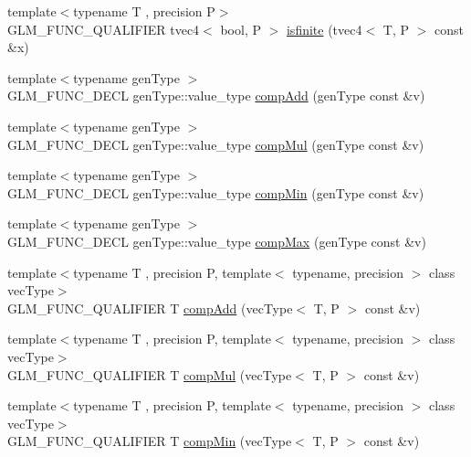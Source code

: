 \begin{DoxyCompactItemize}
\item 
{\footnotesize template$<$typename T , precision P$>$ }\\G\+L\+M\+\_\+\+F\+U\+N\+C\+\_\+\+Q\+U\+A\+L\+I\+F\+I\+E\+R tvec4$<$ bool, P $>$ \hyperlink{namespaceglm_a663d4b476d316e1da9db81a79e9de667}{isfinite} (tvec4$<$ T, P $>$ const \&x)
\item 
{\footnotesize template$<$typename gen\+Type $>$ }\\G\+L\+M\+\_\+\+F\+U\+N\+C\+\_\+\+D\+E\+C\+L gen\+Type\+::value\+\_\+type \hyperlink{group__gtx__component__wise_gaf71833350e15e74d31cbf8a3e7f27051}{comp\+Add} (gen\+Type const \&v)
\item 
{\footnotesize template$<$typename gen\+Type $>$ }\\G\+L\+M\+\_\+\+F\+U\+N\+C\+\_\+\+D\+E\+C\+L gen\+Type\+::value\+\_\+type \hyperlink{group__gtx__component__wise_gae8ab88024197202c9479d33bdc5a8a5d}{comp\+Mul} (gen\+Type const \&v)
\item 
{\footnotesize template$<$typename gen\+Type $>$ }\\G\+L\+M\+\_\+\+F\+U\+N\+C\+\_\+\+D\+E\+C\+L gen\+Type\+::value\+\_\+type \hyperlink{group__gtx__component__wise_gab5d0832b5c7bb01b8d7395973bfb1425}{comp\+Min} (gen\+Type const \&v)
\item 
{\footnotesize template$<$typename gen\+Type $>$ }\\G\+L\+M\+\_\+\+F\+U\+N\+C\+\_\+\+D\+E\+C\+L gen\+Type\+::value\+\_\+type \hyperlink{group__gtx__component__wise_gabfa4bb19298c8c73d4217ba759c496b6}{comp\+Max} (gen\+Type const \&v)
\item 
{\footnotesize template$<$typename T , precision P, template$<$ typename, precision $>$ class vec\+Type$>$ }\\G\+L\+M\+\_\+\+F\+U\+N\+C\+\_\+\+Q\+U\+A\+L\+I\+F\+I\+E\+R T \hyperlink{namespaceglm_a766b58e13ddfe3140ce22939887aa954}{comp\+Add} (vec\+Type$<$ T, P $>$ const \&v)
\item 
{\footnotesize template$<$typename T , precision P, template$<$ typename, precision $>$ class vec\+Type$>$ }\\G\+L\+M\+\_\+\+F\+U\+N\+C\+\_\+\+Q\+U\+A\+L\+I\+F\+I\+E\+R T \hyperlink{namespaceglm_a2b7811672b3a9afce8913dae19548b30}{comp\+Mul} (vec\+Type$<$ T, P $>$ const \&v)
\item 
{\footnotesize template$<$typename T , precision P, template$<$ typename, precision $>$ class vec\+Type$>$ }\\G\+L\+M\+\_\+\+F\+U\+N\+C\+\_\+\+Q\+U\+A\+L\+I\+F\+I\+E\+R T \hyperlink{namespaceglm_a1577bdcf5f8b76fb66296ac53fe77fa8}{comp\+Min} (vec\+Type$<$ T, P $>$ const \&v)

\end{DoxyCompactItemize}
